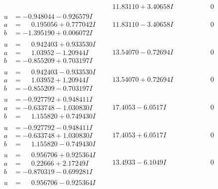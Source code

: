 \documentclass[1p]{elsarticle_modified}
\theoremstyle{definition}
\begin{document}
$$\begin{array}{c|c|c}
 & \phantom{-}11.83110 + 3.40658 I & \phantom{-0.000000 } 0 \\ \hline\begin{aligned}
u &= -0.948044 - 0.926579 I \\
a &= \phantom{-}0.195056 + 0.777042 I \\
b &= -1.395190 + 0.006072 I\end{aligned}
 & \phantom{-}11.83110 - 3.40658 I & \phantom{-0.000000 } 0 \\ \hline\begin{aligned}
u &= \phantom{-}0.942403 + 0.933530 I \\
a &= \phantom{-}1.03952 - 1.20944 I \\
b &= -0.855209 + 0.703197 I\end{aligned}
 & \phantom{-}13.54070 - 0.72694 I & \phantom{-0.000000 } 0 \\ \hline\begin{aligned}
u &= \phantom{-}0.942403 - 0.933530 I \\
a &= \phantom{-}1.03952 + 1.20944 I \\
b &= -0.855209 - 0.703197 I\end{aligned}
 & \phantom{-}13.54070 + 0.72694 I & \phantom{-0.000000 } 0 \\ \hline\begin{aligned}
u &= -0.927792 + 0.948411 I \\
a &= -0.633748 - 1.030830 I \\
b &= \phantom{-}1.155820 + 0.749430 I\end{aligned}
 & \phantom{-}17.4053 - 6.0517 I & \phantom{-0.000000 } 0 \\ \hline\begin{aligned}
u &= -0.927792 - 0.948411 I \\
a &= -0.633748 + 1.030830 I \\
b &= \phantom{-}1.155820 - 0.749430 I\end{aligned}
 & \phantom{-}17.4053 + 6.0517 I & \phantom{-0.000000 } 0 \\ \hline\begin{aligned}
u &= \phantom{-}0.956706 + 0.925364 I \\
a &= \phantom{-}0.22666 + 2.17249 I \\
b &= -0.870319 - 0.699281 I\end{aligned}
 & \phantom{-}13.4933 - 6.1049 I & \phantom{-0.000000 } 0 \\ \hline\begin{aligned}
u &= \phantom{-}0.956706 - 0.925364 I \\

\end{aligned}
\end{array}$$
\end{document}
